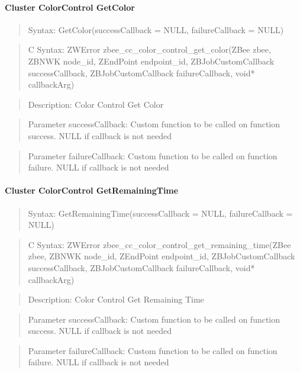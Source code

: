 \paragraph{Cluster ColorControl GetColor}
\begin{quote}Syntax: GetColor(successCallback = NULL, failureCallback = NULL)\end{quote}
\begin{quote}C Syntax: ZWError zbee\_cc\_color\_control\_get\_color(ZBee zbee, ZBNWK node\_id, ZEndPoint endpoint\_id, ZBJobCustomCallback successCallback, ZBJobCustomCallback failureCallback, void* callbackArg)\end{quote}
\begin{quote}Description: Color Control Get Color\end{quote}
\begin{quote}Parameter successCallback: Custom function to be called on function success. NULL if callback is not needed\end{quote}
\begin{quote}Parameter failureCallback: Custom function to be called on function failure. NULL if callback is not needed\end{quote}


\paragraph{Cluster ColorControl GetRemainingTime}
\begin{quote}Syntax: GetRemainingTime(successCallback = NULL, failureCallback = NULL)\end{quote}
\begin{quote}C Syntax: ZWError zbee\_cc\_color\_control\_get\_remaining\_time(ZBee zbee, ZBNWK node\_id, ZEndPoint endpoint\_id, ZBJobCustomCallback successCallback, ZBJobCustomCallback failureCallback, void* callbackArg)\end{quote}
\begin{quote}Description: Color Control Get Remaining Time\end{quote}
\begin{quote}Parameter successCallback: Custom function to be called on function success. NULL if callback is not needed\end{quote}
\begin{quote}Parameter failureCallback: Custom function to be called on function failure. NULL if callback is not needed\end{quote}


